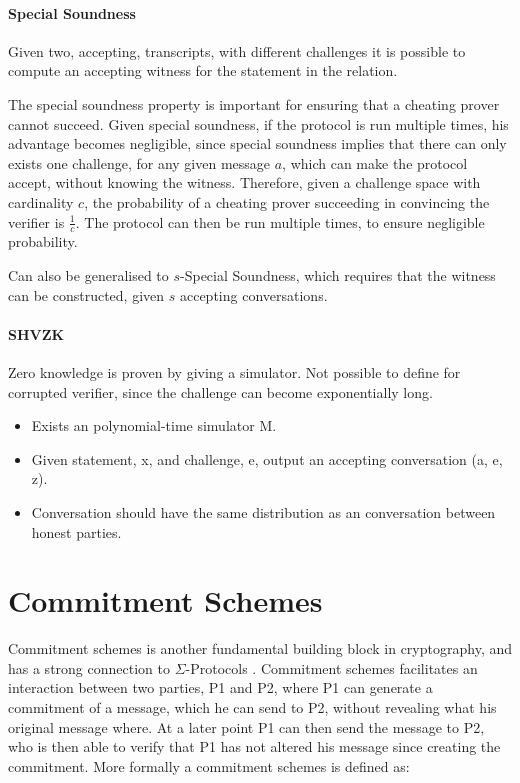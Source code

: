 \paragraph{Special Soundness}
Given two, accepting, transcripts, with different challenges it is possible to
compute an accepting witness for the statement in the relation.

The special soundness property is important for ensuring that a cheating prover
cannot succeed. Given special soundness, if the protocol is run multiple times,
his advantage becomes negligible, since special soundness implies that there can
only exists one challenge, for any given message $a$, which can make the
protocol accept, without knowing the witness. Therefore, given a challenge space
with cardinality $c$, the probability of a cheating prover succeeding in
convincing the verifier is $\frac{1}{c}$. The protocol can then be run multiple
times, to ensure negligible probability.

Can also be generalised to $s$-Special Soundness, which requires that the
witness can be constructed, given $s$ accepting conversations.

\paragraph{SHVZK}
Zero knowledge is proven by giving a simulator. Not possible to define for
corrupted verifier, since the challenge can become exponentially long.
\begin{itemize}
  \item Exists an polynomial-time simulator M.
  \item Given statement, x, and challenge, e, output an accepting
    conversation (a, e, z).
  \item Conversation should have the same distribution as an conversation
    between honest parties.
\end{itemize}




\section{Commitment Schemes}
\label{sec:background:commitment}
Commitment schemes is another fundamental building block in cryptography, and
has a strong connection to $\Sigma$-Protocols . Commitment
schemes facilitates an interaction between two parties, P1 and P2, where P1 can
generate a commitment of a message, which he can send to P2, without revealing
what his original message where. At a later point P1 can then send the message
to P2, who is then able to verify that P1 has not altered his message since
creating the commitment. More formally a commitment schemes is defined as:

